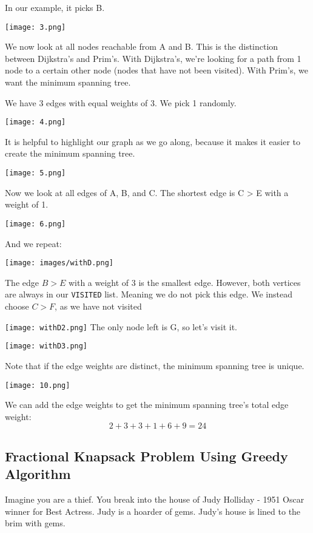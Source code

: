 \documentclass{article}
\newcommand{\code}[1]{\texttt{#1}}
\begin{document}
In our example, it picks B.

\texttt{[image: 3.png]}

We now look at all nodes reachable from A and B. This is the distinction between Dijkstra's and Prim's. With Dijkstra's, we're looking for a path from 1 node to a certain other node (nodes that have not been visited). With Prim's, we want the minimum spanning tree. 

We have 3 edges with equal weights of 3. We pick 1 randomly.

\texttt{[image: 4.png]}

It is helpful to highlight our graph as we go along, because it makes it easier to create the minimum spanning tree.

\texttt{[image: 5.png]}

Now we look at all edges of A, B, and C. The shortest edge is C > E with a weight of 1.

\texttt{[image: 6.png]}

And we repeat:

\texttt{[image: images/withD.png]}

The edge $B > E$ with a weight of 3 is the smallest edge. However, both vertices are always in our \code{VISITED} list. Meaning we do not pick this edge. We instead choose $C > F$, as we have not visited 

\texttt{[image: withD2.png]}
The only node left is G, so let's visit it.

\texttt{[image: withD3.png]}

Note that if the edge weights are distinct, the minimum spanning tree is unique.

\texttt{[image: 10.png]}

We can add the edge weights to get the minimum spanning tree's total edge weight:
$$2 + 3 + 3 + 1 + 6 + 9 = 24$$
\newpage
\subsection{Fractional Knapsack Problem Using Greedy Algorithm}
Imagine you are a thief. You break into the house of Judy Holliday - 1951 Oscar winner for Best Actress. Judy is a hoarder of gems. Judy's house is lined to the brim with gems.
\end{document}
